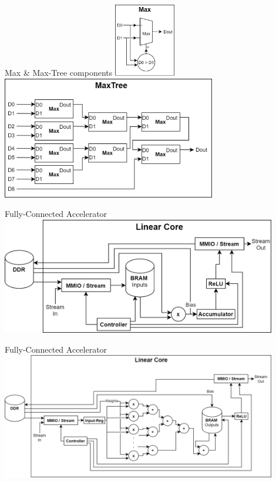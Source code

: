 \begin{frame}{Max \& Max-Tree components}
	\centering
	\includegraphics[width=0.2\textwidth]{../Images/Platform/Max_component.png}
	\hspace{0.5cm}
	\includegraphics[width=0.7\textwidth]{../Images/Platform/MaxTree_component.png}\\
\end{frame}

\begin{frame}{Fully-Connected Accelerator}
	\centering
	\includegraphics[width=0.9\textwidth]{../Images/Platform/Linear_core_serial.png}\\
\end{frame}

\begin{frame}{Fully-Connected Accelerator}
	\centering
	\includegraphics[width=0.9\textwidth]{../Images/Platform/Linear_core_partial_outputs.png}\\
\end{frame}
